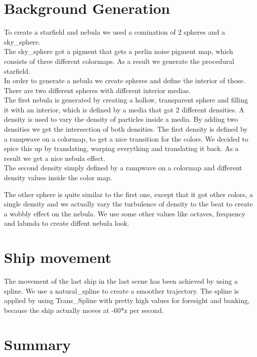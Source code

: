 \documentclass[a4paper, 12pt]{scrartcl}
\begin{document}
    \section{Background Generation}
    To create a starfield and nebula we used a comination of 2 spheres and a sky\_sphere. \\ 
    The sky\_sphere got a pigment that gets a perlin noise pigment map, which consists of three different colormaps. As a result we generate the procedural starfield. \\
    In order to generate a nebula we create spheres and define the interior of those. There are two different spheres with different interior medias. \\
    The first nebula is generated by creating a hollow, transparent sphere and filling it with an interior, which is defined by a media that got 2 different densities. A density is used to vary the density of particles inside a media.
    By adding two densities we get the intersection of both densities. The first density is defined by a rampwave on a colormap, to get a nice transition for the colors. We decided to spice this up by translating, warping everything and translating it back. As a result we get a nice nebula effect. \\
    The second density simply defined by a rampwave on a colormap and different density values inside the color map.

    The other sphere is quite similar to the first one, except that it got other colors, a single density and we actually vary the turbulence of density to the beat to create a wobbly effect on the nebula. 
    We use some other values like octaves, frequency and labmda to create diffent nebula look.

    \section{Ship movement}
    The movement of the last ship in the last scene has been achieved by using a spline. We use a natural\_spline to create a smoother trajectory. The spline is applied by using Trans\_Spline with pretty high values for foresight and banking, because the ship actually moves at -60*z per second.

    \section{Summary}
\end{document}
